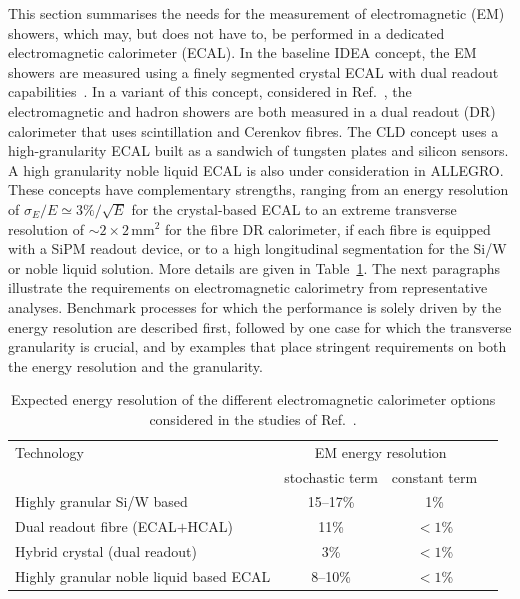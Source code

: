 This section summarises the needs for the measurement of electromagnetic (EM) showers, which may, but does not have to, be performed in a dedicated electromagnetic calorimeter (ECAL).
In the baseline IDEA concept, the EM showers are measured using a finely segmented crystal ECAL with dual readout capabilities~\cite{Lucchini:2020bac}.  
In a variant of this concept, considered in Ref.~\cite{fcc-phys-cdr}, the electromagnetic and hadron showers are both measured in a dual readout (DR) calorimeter that uses scintillation and Cerenkov fibres. 
The CLD concept uses a high-granularity ECAL built as a sandwich of tungsten plates and silicon sensors. 
A high granularity noble liquid ECAL is also under consideration in ALLEGRO. 
These concepts have complementary strengths, ranging from an energy resolution of $\sigma_E / E \simeq 3\% / \sqrt{E}$ for the crystal-based ECAL 
to an extreme transverse resolution of $\sim 2 \times 2$\,mm$^2$ for the fibre DR calorimeter, if each fibre is equipped with a SiPM readout device, 
or to a high longitudinal segmentation for the Si/W or noble liquid solution. 
More details are given in Table~\ref{tab:ECAL_options}. 
The next paragraphs illustrate the requirements on electromagnetic calorimetry from representative analyses. 
Benchmark processes for which the performance is solely driven by the energy resolution are described first, 
followed by one case for which the transverse granularity is crucial, and by examples that place stringent requirements on both the energy resolution and the granularity.

\begin{table}[ht]
\centering
\caption{Expected energy resolution of the different electromagnetic calorimeter options considered in the studies of Ref.~\cite{Aleksa:2021ztd}.}
\label{tab:ECAL_options}
\begin{tabular}{l c c  c }
\toprule
        Technology & \multicolumn{2}{c}{EM energy resolution}\\
                   & stochastic term  & constant term       \\   
\midrule
        Highly granular Si/W based & 15--17\% & 1\% \\
        Dual readout fibre (ECAL$+$HCAL)  & 11\% & $<1$\%  \\
        Hybrid crystal (dual readout) &  3\% &  $<1$\%  \\
        Highly granular noble liquid based ECAL  & 8--10\% & $<1$\% \\
\bottomrule
\end{tabular}
\end{table}

